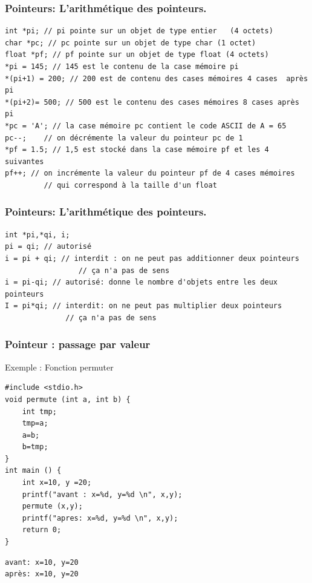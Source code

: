 \documentclass{beamer}
\begin{document}
  
 

\begin{frame}[fragile]
\frametitle{Pointeurs: L'arithmétique des pointeurs.}
\begin{verbatim}
int *pi; // pi pointe sur un objet de type entier	(4 octets)
char *pc; // pc pointe sur un objet de type char (1 octet)
float *pf; // pf pointe sur un objet de type float (4 octets)
*pi = 145; // 145 est le contenu de la case mémoire pi
*(pi+1) = 200; // 200 est de contenu des cases mémoires 4 cases  après pi
*(pi+2)= 500; // 500 est le contenu des cases mémoires 8 cases après pi
*pc = 'A'; // la case mémoire pc contient le code ASCII de A = 65
pc--;	 // on décrémente la valeur du pointeur pc de 1
*pf = 1.5; // 1,5 est stocké dans la case mémoire pf et les 4  suivantes
pf++; // on incrémente la valeur du pointeur pf de 4 cases mémoires
         // qui correspond à la taille d'un float
\end{verbatim}
\end{frame}

\begin{frame}[fragile]
\frametitle{Pointeurs: L'arithmétique des pointeurs.}
\begin{verbatim}
int *pi,*qi, i;   	
pi = qi; // autorisé 
i = pi + qi; // interdit : on ne peut pas additionner deux pointeurs
                 // ça n'a pas de sens
i = pi-qi; // autorisé: donne le nombre d'objets entre les deux pointeurs
I = pi*qi; // interdit: on ne peut pas multiplier deux pointeurs
              // ça n'a pas de sens
\end{verbatim}
\end{frame}


\begin{frame}[fragile]
\frametitle{Pointeur : passage par valeur}

Exemple : Fonction permuter

\begin{verbatim}
#include <stdio.h>
void permute (int a, int b) {
    int tmp;
    tmp=a;
    a=b;
    b=tmp;
}
int main () {
    int x=10, y =20;
    printf("avant : x=%d, y=%d \n", x,y);
    permute (x,y);
    printf("apres: x=%d, y=%d \n", x,y);
    return 0;
}
\end{verbatim}
{\tiny
\begin{verbatim}
avant: x=10, y=20
après: x=10, y=20
\end{verbatim}
}
\end{frame}
\end{document}
